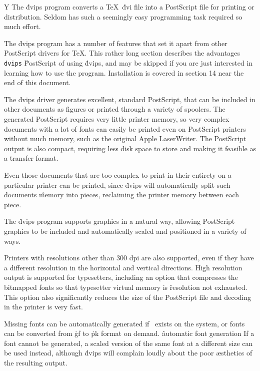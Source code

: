%
%
\newif\ifgeneric\genericfalse
\ifx\ntmanloaded Y\else \fi %
\genericfalse
%
%
The \.{dvips} program converts a \TeX\ \.{dvi} file into a PostScript file
for printing or distribution.  Seldom has such a seemingly easy programming
task required so much effort.



The \.{dvips} program has a number of features that set it apart from other
PostScript drivers for \TeX.  This rather long section describes the advantages
\^{{\tt dvips}}
\^{PostScript}
of using \.{dvips}, and may be skipped if you are just interested in learning
how to use the program.  Installation is covered in section 14 near the
end of this document.

The \.{dvips} driver generates excellent, standard PostScript, that can be
included in other documents as figures or printed through a variety of
spoolers.  The generated PostScript requires very little printer memory,
so very complex documents with a lot of fonts can easily be printed even
on PostScript printers without much memory, such as the original Apple
LaserWriter.  The PostScript output is also compact, requiring less disk
space to store and making it feasible as a transfer format.

Even those documents that are too complex to print in their entirety
on a particular printer
can be printed, since \.{dvips} will automatically split such documents
\^{memory}
into pieces, reclaiming the printer memory between each piece.

The \.{dvips} program supports graphics in a natural way, allowing PostScript
graphics to be included and automatically scaled and positioned in a variety
of ways.

Printers with resolutions other than 300 dpi are also supported, even if they
have a different resolution in the horizontal and vertical directions.
High resolution output is supported for typesetters, including an option
that compresses the bitmapped fonts so that typesetter virtual memory is
\^{resolution}
not exhausted.	This option also significantly reduces the size of the
PostScript file and decoding in the printer is very fast.

Missing fonts can be automatically generated if \MF\ exists on the system,
or fonts can be converted from \.{gf} to \.{pk} format on demand.
\^{automatic font generation}
If a font cannot be generated, a scaled version of the same font at a
different size can be used instead, although \.{dvips} will complain
loudly about the poor \ae sthetics of the resulting output.

